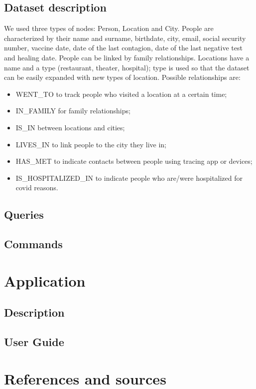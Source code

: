 \documentclass[12pt, a4paper]{article}
\begin{document}
\subsection{Dataset description}
We used three types of nodes: Person, Location and City. 
People are characterized by their name and surname, birthdate, city, email, social security number, vaccine date, date of the last contagion, date of the last negative test and healing date. People can be linked by family relationships.
Locations have a name and a type (restaurant, theater, hospital); type is used so that the dataset can be easily expanded with new types of location.
Possible relationships are: 
\begin{itemize}
	\item WENT\_TO to track people who visited a location at a certain time;
	\item IN\_FAMILY for family relationships;
	\item IS\_IN between locations and cities;
	\item LIVES\_IN to link people to the city they live in;
	\item HAS\_MET to indicate contacts between people using tracing app or devices;
	\item IS\_HOSPITALIZED\_IN to indicate people who are/were hospitalized for covid reasons.

\end{itemize}

\subsection{Queries}

\blindtext

\subsection{Commands}

\blindtext

\clearpage

\section{Application}

\subsection{Description}

\blindtext

\subsection{User Guide}

\blindtext

\clearpage

\section{References and sources}

\blindtext

\clearpage
\end{document}
